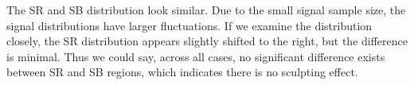 \documentclass[12pt]{article}
\begin{document}
        The SR and SB distribution look similar. Due to the small signal sample size, the signal distributions have larger fluctuations. If we examine the distribution closely, the SR distribution appears slightly shifted to the right, but the difference is minimal. Thus we could say, across all cases, no significant difference exists between SR and SB regions, which indicates there is no sculpting effect. 
        \begin{figure}[htpb]
            \centering
             \\
\end{figure}
\end{document}
